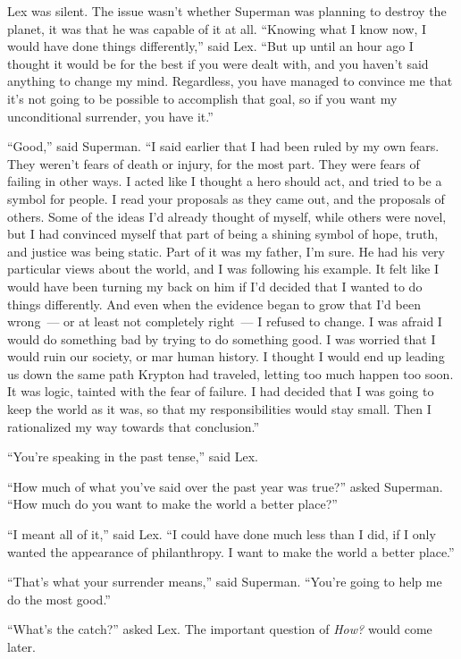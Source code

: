 \documentclass[ebook,12pt]{memoir}
\begin{document}
Lex was silent. The issue wasn't whether Superman was planning to
destroy the planet, it was that he was capable of it at all. ``Knowing
what I know now, I would have done things differently,'' said Lex. ``But
up until an hour ago I thought it would be for the best if you were
dealt with, and you haven't said anything to change my mind. Regardless,
you have managed to convince me that it's not going to be possible to
accomplish that goal, so if you want my unconditional surrender, you
have it.''

``Good,'' said Superman. ``I said earlier that I had been ruled by my
own fears. They weren't fears of death or injury, for the most part.
They were fears of failing in other ways. I acted like I thought a hero
should act, and tried to be a symbol for people. I read your proposals
as they came out, and the proposals of others. Some of the ideas I'd
already thought of myself, while others were novel, but I had convinced
myself that part of being a shining symbol of hope, truth, and justice
was being static. Part of it was my father, I'm sure. He had his very
particular views about the world, and I was following his example. It
felt like I would have been turning my back on him if I'd decided that I
wanted to do things differently. And even when the evidence began to
grow that I'd been wrong~--- or at least not completely right~--- I
refused to change. I was afraid I would do something bad by trying to do
something good. I was worried that I would ruin our society, or mar
human history. I thought I would end up leading us down the same path
Krypton had traveled, letting too much happen too soon. It was logic,
tainted with the fear of failure. I had decided that I was going to keep
the world as it was, so that my responsibilities would stay small. Then
I rationalized my way towards that conclusion.''

``You're speaking in the past tense,'' said Lex.

``How much of what you've said over the past year was true?'' asked
Superman. ``How much do you want to make the world a better place?''

``I meant all of it,'' said Lex. ``I could have done much less than I
did, if I only wanted the appearance of philanthropy. I want to make the
world a better place.''

``That's what your surrender means,'' said Superman. ``You're going to
help me do the most good.''

``What's the catch?'' asked Lex. The important question of \emph{How?}
would come later.
\end{document}
